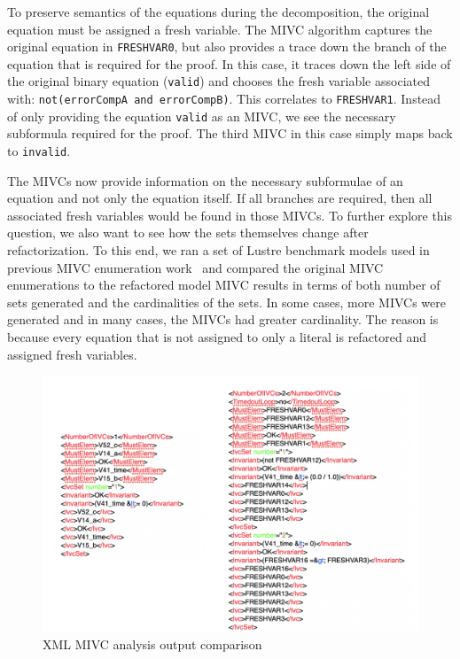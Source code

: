 To preserve semantics of the equations during the decomposition, the original equation must be assigned a fresh variable. The MIVC algorithm captures the original equation in \texttt{FRESHVAR0}, but also provides a trace down the branch of the equation that is required for the proof. In this case, it traces down the left side of the original binary equation (\texttt{valid}) and chooses the fresh variable associated with: \texttt{not(errorCompA and errorCompB)}. This correlates to \texttt{FRESHVAR1}. Instead of only providing the equation \texttt{valid} as an MIVC, we see the necessary subformula required for the proof. The third MIVC in this case simply maps back to \texttt{invalid}. 

The MIVCs now provide information on the necessary subformulae of an equation and not only the equation itself. If all branches are required, then all associated fresh variables would be found in those MIVCs. To further explore this question, we also want to see how the sets themselves change after refactorization. To this end, we ran a set of Lustre benchmark models used in previous MIVC enumeration work~\cite{ghassabani_2018} and compared the original MIVC enumerations to the refactored model MIVC results in terms of both number of sets generated and the cardinalities of the sets. In some cases, more MIVCs were generated and in many cases, the MIVCs had greater cardinality. The reason is because every equation that is not assigned to only a literal is refactored and assigned fresh variables. 

\begin{figure}[h!]
\begin{center}
\includegraphics[width=1.0\textwidth]{images/xml_output.png}
\caption{XML MIVC analysis output comparison} 
\label{fig:xml_ivc}
\end{center}
\end{figure}

